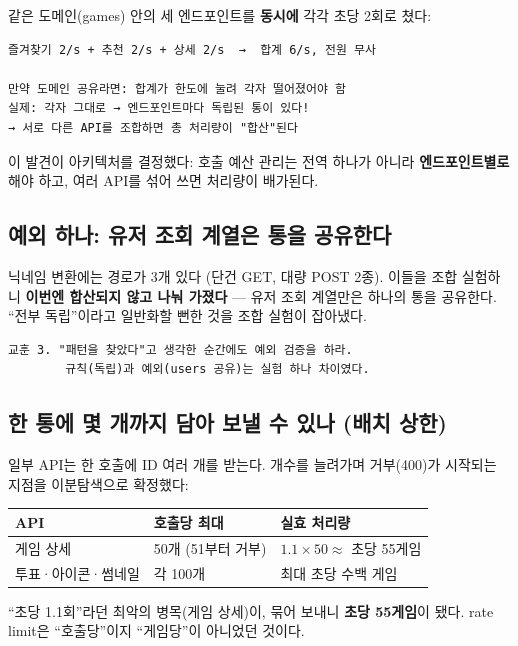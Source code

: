 \documentclass[11pt]{article}
\begin{document}
같은 도메인(games) 안의 세 엔드포인트를 \textbf{동시에} 각각 초당 2회로 쳤다:
\begin{Verbatim}[frame=single, fontsize=\small]
즐겨찾기 2/s + 추천 2/s + 상세 2/s  →  합계 6/s, 전원 무사

만약 도메인 공유라면: 합계가 한도에 눌려 각자 떨어졌어야 함
실제: 각자 그대로 → 엔드포인트마다 독립된 통이 있다!
→ 서로 다른 API를 조합하면 총 처리량이 "합산"된다
\end{Verbatim}

이 발견이 아키텍처를 결정했다: 호출 예산 관리는 전역 하나가 아니라
\textbf{엔드포인트별로} 해야 하고, 여러 API를 섞어 쓰면 처리량이 배가된다.

\subsection{예외 하나: 유저 조회 계열은 통을 공유한다}

닉네임 변환에는 경로가 3개 있다 (단건 GET, 대량 POST 2종). 이들을 조합 실험하니
\textbf{이번엔 합산되지 않고 나눠 가졌다} --- 유저 조회 계열만은 하나의 통을 공유한다.
``전부 독립''이라고 일반화할 뻔한 것을 조합 실험이 잡아냈다.

\begin{Verbatim}[frame=single, fontsize=\small]
교훈 3. "패턴을 찾았다"고 생각한 순간에도 예외 검증을 하라.
        규칙(독립)과 예외(users 공유)는 실험 하나 차이였다.
\end{Verbatim}

\subsection{한 통에 몇 개까지 담아 보낼 수 있나 (배치 상한)}

일부 API는 한 호출에 ID 여러 개를 받는다. 개수를 늘려가며 거부(400)가 시작되는
지점을 이분탐색으로 확정했다:

\begin{center}
\begin{tabular}{lll}
\toprule
API & 호출당 최대 & 실효 처리량 \\
\midrule
게임 상세 & 50개 (51부터 거부) & $1.1 \times 50 \approx$ 초당 55게임 \\
투표·아이콘·썸네일 & 각 100개 & 최대 초당 수백 게임 \\
\bottomrule
\end{tabular}
\end{center}

``초당 1.1회''라던 최악의 병목(게임 상세)이, 묶어 보내니 \textbf{초당 55게임}이 됐다.
rate limit은 ``호출당''이지 ``게임당''이 아니었던 것이다.
\end{document}
